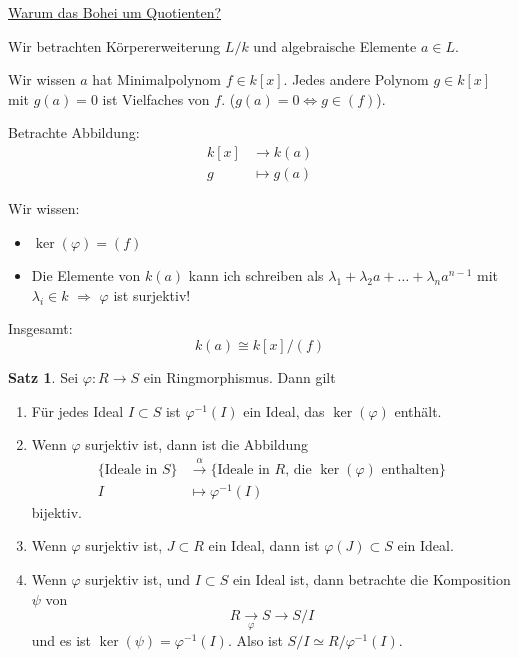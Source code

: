 \documentclass[12pt,parskip=full]{scrartcl}
\newcommand{\heading}{\underline}
\theoremstyle{definition}
\newtheorem{theorem}{Satz}[section]
\theoremstyle{remark}
\begin{document}
	\heading{Warum das Bohei um Quotienten?}
	
	Wir betrachten Körpererweiterung $L/k$ und algebraische Elemente $a \in L$.
	
	Wir wissen $a$ hat Minimalpolynom $f \in k[x]$. Jedes andere Polynom $g \in k[x]$ mit $g(a) = 0$ ist Vielfaches von $f$. ($g(a) = 0 \Leftrightarrow g \in (f)$).
	
	Betrachte Abbildung:
	\begin{align*}
		k[x] &\to k(a) \\
		g &\mapsto g(a)
	\end{align*}
	
	Wir wissen:
	\begin{itemize}
		\item $\ker(\varphi) = (f)$
		\item Die Elemente von $k(a)$ kann ich schreiben als $\lambda_1 + \lambda_2 a + \dots + \lambda_n a^{n-1}$ mit $\lambda_i \in k$ $\Rightarrow$ $\varphi$ ist surjektiv!
	\end{itemize}

	Insgesamt:
	\begin{equation*}
		k(a) \cong k[x]/(f)
	\end{equation*}

	\begin{theorem}
		Sei $\varphi: R \to S$ ein Ringmorphismus. Dann gilt
		\begin{enumerate}
			\item Für jedes Ideal $I \subset S$ ist $\varphi^{-1}(I)$ ein Ideal, das $\ker(\varphi)$ enthält.
			\item Wenn $\varphi$ surjektiv ist, dann ist die Abbildung 
			\begin{align*}
				\{ \text{Ideale in $S$} \} &\overset{\alpha}{\to} \{ \text{Ideale in $R$, die $\ker(\varphi)$ enthalten} \} \\
				I &\mapsto \varphi^{-1}(I)
			\end{align*}
			bijektiv.
			\item Wenn $\varphi$ surjektiv ist, $J \subset R$ ein Ideal, dann ist $\varphi(J) \subset S$ ein Ideal.
			\item Wenn $\varphi$ surjektiv ist, und $I \subset S$ ein Ideal ist, dann betrachte die Komposition $\psi$ von
			\begin{equation*}
				R \underset{\varphi}{\to} S \to S/I
			\end{equation*}
			und es ist $\ker(\psi) = \varphi^{-1}(I)$. Also ist $S/I \simeq R/\varphi^{-1}(I)$.
		\end{enumerate}
	\end{theorem}
\end{document}
